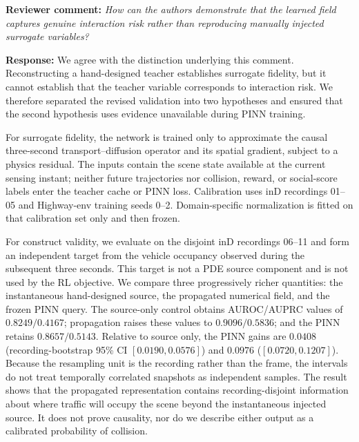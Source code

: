 
\noindent\textbf{Reviewer comment:}
\emph{How can the authors demonstrate that the learned field captures genuine
interaction risk rather than reproducing manually injected surrogate
variables?}

\noindent\textbf{Response:}
We agree with the distinction underlying this comment. Reconstructing a
hand-designed teacher establishes surrogate fidelity, but it cannot establish
that the teacher variable corresponds to interaction risk. We therefore
separated the revised validation into two hypotheses and ensured that the
second hypothesis uses evidence unavailable during PINN training.

For surrogate fidelity, the network is trained only to approximate the causal
three-second transport--diffusion operator and its spatial gradient, subject
to a physics residual. The inputs contain the scene state available at the
current sensing instant; neither future trajectories nor collision, reward,
or social-score labels enter the teacher cache or PINN loss. Calibration uses
inD recordings 01--05 and Highway-env training seeds 0--2. Domain-specific
normalization is fitted on that calibration set only and then frozen.

For construct validity, we evaluate on the disjoint inD recordings 06--11 and
form an independent target from the vehicle occupancy observed during the
subsequent three seconds. This target is not a PDE source component and is not
used by the RL objective. We compare three progressively richer quantities:
the instantaneous hand-designed source, the propagated numerical field, and
the frozen PINN query. The source-only control obtains AUROC/AUPRC values of
$0.8249/0.4167$; propagation raises these values to $0.9096/0.5836$; and the
PINN retains $0.8657/0.5143$. Relative to source only, the PINN gains are
$0.0408$ (recording-bootstrap 95\% CI $[0.0190,0.0576]$) and $0.0976$
($[0.0720,0.1207]$). Because the resampling unit is the recording rather than
the frame, the intervals do not treat temporally correlated snapshots as
independent samples. The result shows that the propagated representation
contains recording-disjoint information about where traffic will occupy the
scene beyond the instantaneous injected source. It does not prove causality,
nor do we describe either output as a calibrated probability of collision.

